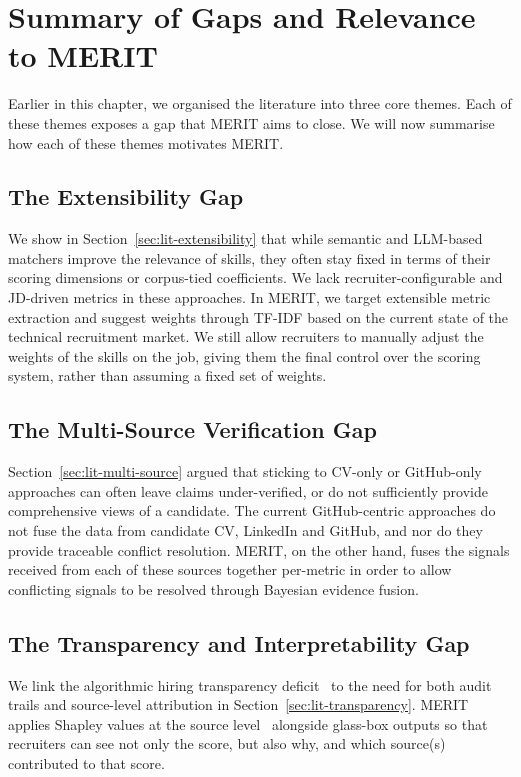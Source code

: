 \section{Summary of Gaps and Relevance to MERIT}
\label{sec:relevance-to-merit}

Earlier in this chapter, we organised the literature into three core themes. Each of these themes
exposes a gap that MERIT aims to close. We will now summarise how each of these themes motivates MERIT.

\subsection*{The Extensibility Gap}
We show in Section~\ref{sec:lit-extensibility} that 
while semantic and LLM-based matchers improve the relevance of skills, they often stay fixed in terms
of their scoring dimensions or corpus-tied coefficients. We lack recruiter-configurable and JD-driven
metrics in these approaches. In MERIT, we target extensible metric extraction and suggest weights
through TF-IDF based on the current state of the technical recruitment market.
We still allow recruiters to manually adjust the weights of the skills on the job, giving them the 
final control over the scoring system, rather than assuming a fixed set of weights.

\subsection*{The Multi-Source Verification Gap}
Section~\ref{sec:lit-multi-source} argued that sticking to 
CV-only or GitHub-only approaches can often leave claims under-verified, or do not sufficiently
provide comprehensive views of a candidate. The current GitHub-centric approaches do not fuse the 
data from candidate CV, LinkedIn and GitHub, and nor do they provide traceable conflict resolution.
MERIT, on the other hand, fuses the signals received from each of these sources together per-metric in
order to allow conflicting signals to be resolved through Bayesian evidence fusion.

\subsection*{The Transparency and Interpretability Gap}
We link the algorithmic hiring transparency deficit~\cite{bogen2018,raghavan2020} to the need
for both audit trails and source-level attribution in Section~\ref{sec:lit-transparency}.
MERIT applies Shapley values at the source level~\cite{lundberg2017unified} alongside glass-box
outputs so that recruiters can see not only the score, but also why, and which source(s) contributed to that score.

